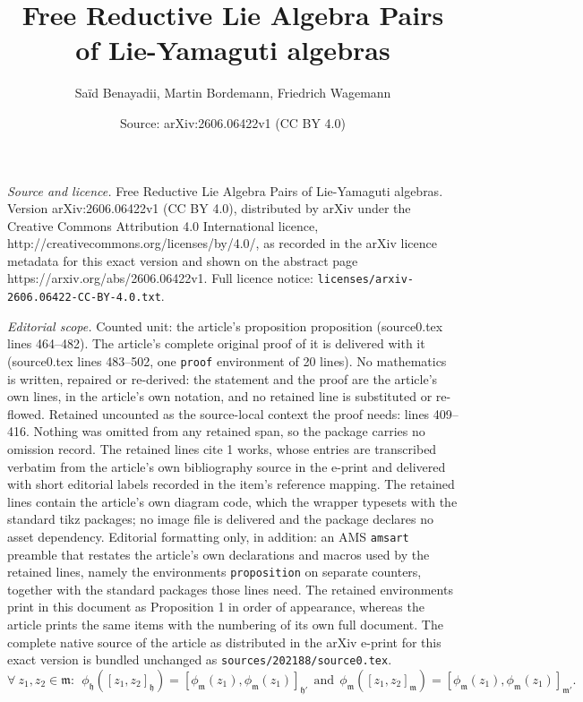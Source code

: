 \documentclass[10pt,a4paper]{amsart}
\title{Free Reductive Lie Algebra Pairs of Lie-Yamaguti algebras}
\author{Sa\"id Benayadii, Martin Bordemann, Friedrich Wagemann}
\date{Source: arXiv:2606.06422v1 (CC BY 4.0)}
\begin{document}
\maketitle

\noindent\emph{Source and licence.} Free Reductive Lie Algebra Pairs of Lie-Yamaguti algebras. Version arXiv:2606.06422v1 (CC BY 4.0), distributed by arXiv under the Creative Commons Attribution 4.0 International licence, http://creativecommons.org/licenses/by/4.0/, as recorded in the arXiv licence metadata for this exact version and shown on the abstract page https://arxiv.org/abs/2606.06422v1. Full licence notice: \texttt{licenses/arxiv-2606.06422-CC-BY-4.0.txt}.\par\smallskip

\noindent\textit{Editorial scope.} Counted unit: the article's proposition proposition (source0.tex lines 464--482). The article's complete original proof of it is delivered with it (source0.tex lines 483--502, one \texttt{proof} environment of 20 lines). No mathematics is written, repaired or re-derived: the statement and the proof are the article's own lines, in the article's own notation, and no retained line is substituted or re-flowed.  Retained uncounted as the source-local context the proof needs: lines 409--416.  Nothing was omitted from any retained span, so the package carries no omission record.  The retained lines cite 1 works, whose entries are transcribed verbatim from the article's own bibliography source in the e-print and delivered with short editorial labels recorded in the item's reference mapping.  The retained lines contain the article's own diagram code, which the wrapper typesets with the standard tikz packages; no image file is delivered and the package declares no asset dependency.  Editorial formatting only, in addition: an AMS \texttt{amsart} preamble that restates the article's own declarations and macros used by the retained lines, namely the environments \texttt{proposition} on separate counters, together with the standard packages those lines need.  The retained environments print in this document as Proposition 1 in order of appearance, whereas the article prints the same items with the numbering of its own full document.  The complete native source of the article as distributed in the arXiv e-print for this exact version is bundled unchanged as \texttt{sources/202188/source0.tex}.
   \begin{equation}\label{EqCompMMComponentsMorph}
   	\forall~z_1,z_2\in\mathfrak{m}:~~
   \phi_\mathfrak{h}	\left([z_1,z_2]_\mathfrak{h}\right)
   =\left[\phi_\mathfrak{m}(z_1),\phi_\mathfrak{m}(z_1)\right]_{\mathfrak{h}'}
   ~~\mathrm{and}~~
   \phi_\mathfrak{m}	\left([z_1,z_2]_\mathfrak{m}\right)
   =\left[\phi_\mathfrak{m}(z_1),\phi_\mathfrak{m}(z_1)\right]_{\mathfrak{m}'} .   
   \end{equation}
\end{document}

